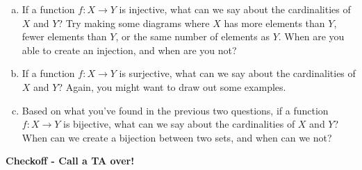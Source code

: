 \documentclass[12pt,letterpaper]{article}
\newif\ifsol
\newcommand{\solu}[2]{ \begin{mdframed} \ifsol #2 \else \vspace{#1} \fi \end{mdframed} }
\begin{document}
      \begin{enumerate}[a.]
      \item If a function $f : X \rightarrow Y$ is injective, what can we say about the cardinalities of $X$ and $Y$? Try making some diagrams where $X$ has more elements than $Y$, fewer elements than $Y$, or the same number of elements as $Y$. When are you able to create an injection, and when are you not?
      
      \solu{2 cm}{If and only if $|X| \leq |Y|$, then there exists $f : X \rightarrow Y$ such that $f$ is injective.}
      
      \item If a function $f : X \rightarrow Y$ is surjective, what can we say about the cardinalities of $X$ and $Y$? Again, you might want to draw out some examples.
      
      \solu{2 cm}{If and only if $|X| \geq |Y|$, then there exists $f : X \rightarrow Y$ such that $f$ is surjective.}
      
      \item Based on what you've found in the previous two questions, if a function $f: X \rightarrow Y$ is bijective, what can we say about the cardinalities of $X$ and $Y$? When can we create a bijection between two sets, and when can we not?
      
      \solu{2 cm}{If and only if $|X| = |Y|$, then there exists $f : X \rightarrow Y$ such that $f$ is bijective.}

      \end{enumerate}
      
\textbf{Checkoff - Call a TA over!}
\end{document}
